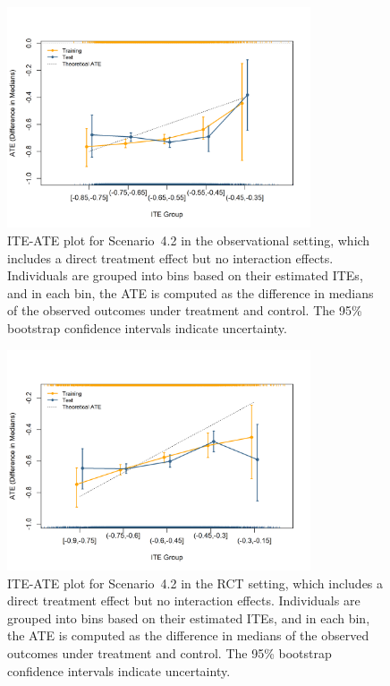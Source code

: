 \begin{figure}[htbp]
\centering
\includegraphics[width=0.8\textwidth]{img/results/observ_scenario2_ITE_ATE.png}
\vspace{-15pt}
\caption{ITE-ATE plot for Scenario~4.2 in the observational setting, which includes a direct treatment effect but no interaction effects. Individuals are grouped into bins based on their estimated ITEs, and in each bin, the ATE is computed as the difference in medians of the observed outcomes under treatment and control. The 95\% bootstrap confidence intervals indicate uncertainty.}
\label{fig:observ_scenario2_ite_ATE}
\end{figure}



\begin{figure}[htbp]
\centering
\includegraphics[width=0.8\textwidth]{img/results/rct_scenario2_ITE_ATE.png}
\vspace{-15pt}
\caption{ITE-ATE plot for Scenario~4.2 in the RCT setting, which includes a direct treatment effect but no interaction effects. Individuals are grouped into bins based on their estimated ITEs, and in each bin, the ATE is computed as the difference in medians of the observed outcomes under treatment and control. The 95\% bootstrap confidence intervals indicate uncertainty.}
\label{fig:rct_scenario2_ite_ATE}
\end{figure}



